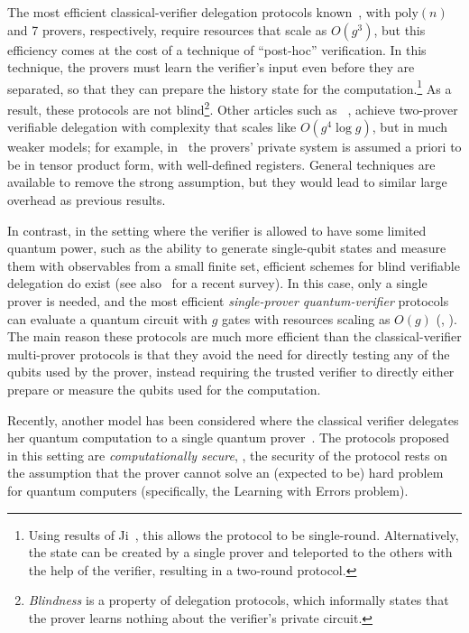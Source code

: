 \documentclass{toc}
\begin{document}
The most efficient classical-verifier delegation protocols 
known~\cite{hajdusek2015posthoc-updated,  %
natarajan2016robust}, 
with $\mathrm{poly}(n)$ and 7 provers, respectively,
require resources that scale as $O(g^3)$, 
but this efficiency comes at the cost of a technique of ``post-hoc''
verification. In this technique, the provers must learn the
verifier's input even before they are separated, so that they can prepare the
history state for the computation.\footnote{Using results of Ji~\cite{Ji16},
this allows the protocol to be single-round. Alternatively, the state can be created by a single prover and teleported to the others with the help of the verifier, resulting in a two-round protocol.} As a result, these protocols are not blind\footnote{
\emph{Blindness} is a property of delegation protocols, which informally states that the prover learns nothing about the verifier's private circuit.}. 
Other %
articles  %
such as ~\cite{HayashiH16},
achieve two-prover verifiable delegation with complexity that scales like $O(g^4\log g)$,  but in much weaker models; for example, in~\cite{HayashiH16} the provers' private system is assumed a priori to be in tensor product form, with well-defined registers.  General techniques are available to remove the strong assumption, but they would lead to similar large overhead as previous results.

In contrast, in the setting where the verifier is allowed to have some limited quantum power, such as the ability to generate single-qubit states and measure them with observables from a small finite set, efficient schemes for blind verifiable delegation do exist \cite{aharonov10qpip,fitzsimons12vubqc,Morimae14,broadbent15howtoverify,HayashiM15,%
MF16a,FHM18,  %
FujiiH17, MorimaeTH17}
(see also~\cite{fitzsimons2016survey} for a recent survey). In this case, only a single prover is needed, and the most efficient \emph{single-prover quantum-verifier} protocols can evaluate a quantum circuit with $g$ gates with resources scaling as $O(g)$ (\eg, \cite{broadbent15howtoverify}). The main reason these protocols are much more efficient than the classical-verifier multi-prover protocols is that they avoid the need for directly testing any of the qubits used by the prover, instead requiring the trusted verifier to directly either prepare or measure the qubits used for the computation. 


Recently, another model has been considered where the classical verifier delegates her quantum computation to a single quantum prover~\cite{mahadev2018,GheorghiuV19}. The protocols proposed in this setting are \emph{computationally secure}, \ie, the security of the protocol rests on the assumption that the prover cannot solve an (expected to be) hard problem for quantum computers (specifically, the Learning with Errors problem). 
\end{document}

